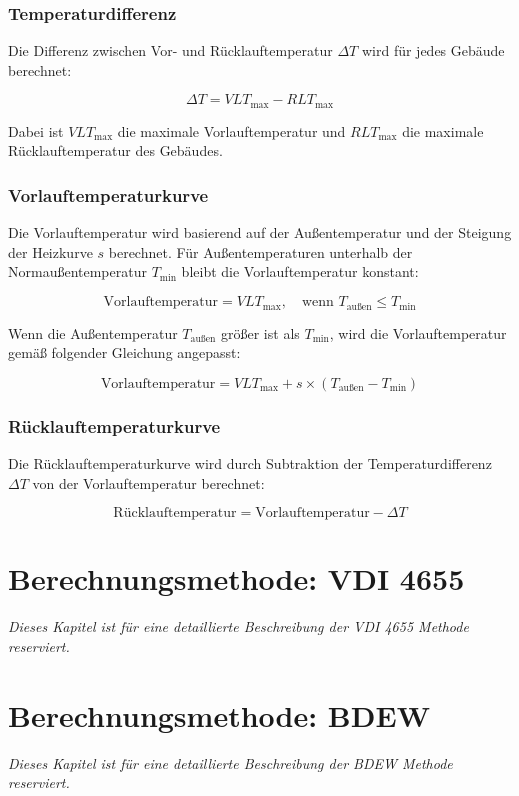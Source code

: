 \documentclass[a4paper,12pt]{article}
\begin{document}
\subsubsection{Temperaturdifferenz}
Die Differenz zwischen Vor- und Rücklauftemperatur \( \Delta T \) wird für jedes Gebäude berechnet:

\[
\Delta T = VLT_{\text{max}} - RLT_{\text{max}}
\]

Dabei ist \( VLT_{\text{max}} \) die maximale Vorlauftemperatur und \( RLT_{\text{max}} \) die maximale Rücklauftemperatur des Gebäudes.

\subsubsection{Vorlauftemperaturkurve}
Die Vorlauftemperatur wird basierend auf der Außentemperatur und der Steigung der Heizkurve \( s \) berechnet. Für Außentemperaturen unterhalb der Normaußentemperatur \( T_{\text{min}} \) bleibt die Vorlauftemperatur konstant:

\[
\text{Vorlauftemperatur} = VLT_{\text{max}}, \quad \text{wenn } T_{\text{außen}} \leq T_{\text{min}}
\]

Wenn die Außentemperatur \( T_{\text{außen}} \) größer ist als \( T_{\text{min}} \), wird die Vorlauftemperatur gemäß folgender Gleichung angepasst:

\[
\text{Vorlauftemperatur} = VLT_{\text{max}} + s \times (T_{\text{außen}} - T_{\text{min}})
\]

\subsubsection{Rücklauftemperaturkurve}
Die Rücklauftemperaturkurve wird durch Subtraktion der Temperaturdifferenz \( \Delta T \) von der Vorlauftemperatur berechnet:

\[
\text{Rücklauftemperatur} = \text{Vorlauftemperatur} - \Delta T
\]

\section{Berechnungsmethode: VDI 4655}
\textit{Dieses Kapitel ist für eine detaillierte Beschreibung der VDI 4655 Methode reserviert.}

\section{Berechnungsmethode: BDEW}
\textit{Dieses Kapitel ist für eine detaillierte Beschreibung der BDEW Methode reserviert.}
\end{document}
